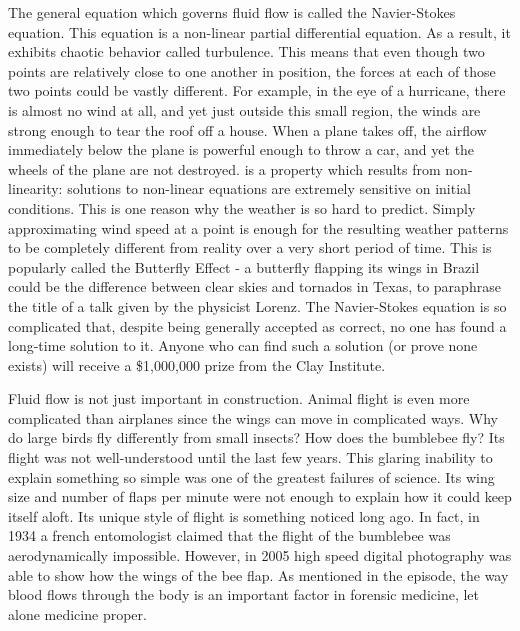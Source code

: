The general equation which governs fluid flow is called the Navier-Stokes equation. This equation is a non-linear partial differential equation. As a result, it exhibits chaotic behavior called turbulence. This means that even though two points are relatively close to one another in position, the forces at each of those two points could be vastly different. For example, in the eye of a hurricane, there is almost no wind at all, and yet just outside this small region, the winds are strong enough to tear the roof off a house.  When a plane takes off, the airflow immediately below the plane is powerful enough to throw a car, and yet the wheels of the plane are not destroyed.  is a property which results from non-linearity: solutions to non-linear equations are extremely sensitive on initial conditions. This is one reason why the weather is so hard to predict. Simply approximating wind speed at a point is enough for the resulting weather patterns to be completely different from reality over a very short period of time. This is popularly called the Butterfly Effect - a butterfly flapping its wings in Brazil could be the difference between clear skies and tornados in Texas, to paraphrase the title of a talk given by the physicist Lorenz. The Navier-Stokes equation is so complicated that, despite being generally accepted as correct, no one has found a long-time solution to it. Anyone who can find such a solution (or prove none exists) will receive a \$1,000,000 prize from the Clay Institute.


Fluid flow is not just important in construction. Animal flight is even more complicated than airplanes since the wings can move in complicated ways. Why do large birds fly differently from small insects?  How does the bumblebee fly? Its flight was not well-understood until the last few years. This glaring inability to explain something so simple was one of the greatest failures of science. Its wing size and number of flaps per minute were not enough to explain how it could keep itself aloft. Its unique style of flight is something noticed long ago. In fact, in 1934 a french entomologist claimed that the flight of the bumblebee was aerodynamically impossible. However, in 2005 high speed digital photography was able to show how the wings of the bee flap. As mentioned in the episode, the way blood flows through the body is an important factor in forensic medicine, let alone medicine proper.